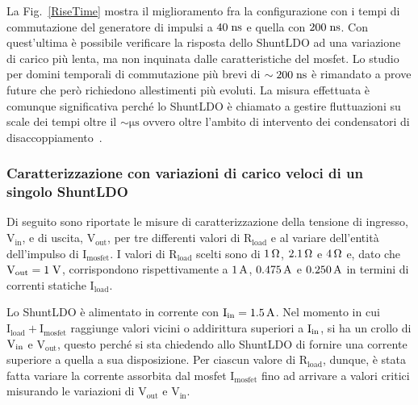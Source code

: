 La Fig.~\ref{RiseTime} mostra il miglioramento fra la configurazione con i tempi di commutazione del generatore di impulsi a $40 \rm \; ns$ e quella con $200 \rm \; ns$. Con quest'ultima è possibile verificare la risposta dello ShuntLDO ad una variazione di carico più lenta, ma non inquinata dalle caratteristiche del mosfet. Lo studio per domini temporali di commutazione pi\`u brevi di $\sim 200\rm \; ns$ \`e rimandato a prove future che per\`o richiedono allestimenti pi\`u evoluti. La misura effettuata \`e comunque significativa perch\'e lo ShuntLDO \`e chiamato a gestire fluttuazioni su scale dei tempi oltre il $\sim \mathrm{\mu s}$ ovvero oltre l'ambito di intervento dei condensatori di disaccoppiamento~\cite{saramarconi}.
 

\subsubsection{Caratterizzazione con variazioni di carico veloci di un singolo ShuntLDO}

Di seguito sono riportate le misure di caratterizzazione della tensione di ingresso, $\mathrm{V_{in}}$, e di uscita, $\mathrm{V_{out}}$, per tre differenti valori di $\mathrm{R_{load}}$ e al variare dell'entit\`a dell'impulso di $\mathrm{I_{mosfet}}$.
I valori di $\mathrm{R_{load}}$ scelti sono di $1{\rm \, \Omega}$, $2.1{\rm \, \Omega}$ e $4{\rm \, \Omega}$ e, dato che $\mathrm{V_{out}=1\rm \; V}$, corrispondono rispettivamente a $1\rm \, A$, $0.475\rm \, A$ e $0.250\rm \, A$ in termini di correnti statiche $\mathrm{I_{load}}$.

Lo ShuntLDO è alimentato in corrente con $\mathrm{I_{in}} = 1.5\rm \, A$. Nel momento in cui $\mathrm{I_{load}+I_{mosfet}}$ raggiunge valori vicini o addirittura superiori  a $\mathrm{I_{in}}$, si ha un crollo di $\mathrm{V_{in}}$ e  $\mathrm{V_{out}}$, questo perché si sta chiedendo allo ShuntLDO di fornire una corrente superiore a quella a sua disposizione.
Per ciascun valore di $\mathrm{R_{load}}$, dunque, è stata fatta variare la corrente assorbita dal mosfet $\mathrm{I_{mosfet}}$ fino ad arrivare a valori critici misurando le variazioni di $\mathrm{V_{out}}$ e $\mathrm{V_{in}}$. 

